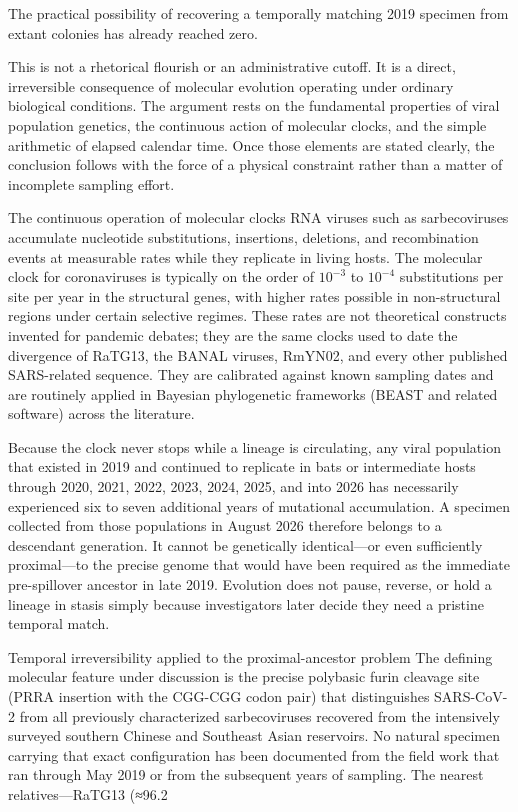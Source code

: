 The practical possibility of recovering a temporally matching 2019 specimen from extant colonies has already reached zero.

This is not a rhetorical flourish or an administrative cutoff. It is a direct, irreversible consequence of molecular evolution operating under ordinary biological conditions. The argument rests on the fundamental properties of viral population genetics, the continuous action of molecular clocks, and the simple arithmetic of elapsed calendar time. Once those elements are stated clearly, the conclusion follows with the force of a physical constraint rather than a matter of incomplete sampling effort.

The continuous operation of molecular clocks
RNA viruses such as sarbecoviruses accumulate nucleotide substitutions, insertions, deletions, and recombination events at measurable rates while they replicate in living hosts. The molecular clock for coronaviruses is typically on the order of \(10^{-3}\) to \(10^{-4}\) substitutions per site per year in the structural genes, with higher rates possible in non-structural regions under certain selective regimes. These rates are not theoretical constructs invented for pandemic debates; they are the same clocks used to date the divergence of RaTG13, the BANAL viruses, RmYN02, and every other published SARS-related sequence. They are calibrated against known sampling dates and are routinely applied in Bayesian phylogenetic frameworks (BEAST and related software) across the literature.

Because the clock never stops while a lineage is circulating, any viral population that existed in 2019 and continued to replicate in bats or intermediate hosts through 2020, 2021, 2022, 2023, 2024, 2025, and into 2026 has necessarily experienced six to seven additional years of mutational accumulation. A specimen collected from those populations in August 2026 therefore belongs to a descendant generation. It cannot be genetically identical—or even sufficiently proximal—to the precise genome that would have been required as the immediate pre-spillover ancestor in late 2019. Evolution does not pause, reverse, or hold a lineage in stasis simply because investigators later decide they need a pristine temporal match.

Temporal irreversibility applied to the proximal-ancestor problem
The defining molecular feature under discussion is the precise polybasic furin cleavage site (PRRA insertion with the CGG-CGG codon pair) that distinguishes SARS-CoV-2 from all previously characterized sarbecoviruses recovered from the intensively surveyed southern Chinese and Southeast Asian reservoirs. No natural specimen carrying that exact configuration has been documented from the field work that ran through May 2019 or from the subsequent years of sampling. The nearest relatives—RaTG13 (≈96.2 %

